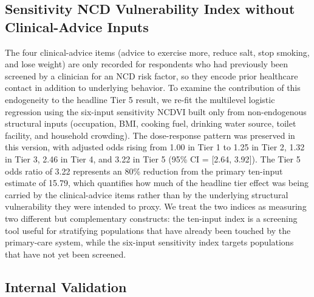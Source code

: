 \documentclass[
  12pt,
  a4paper]{article}
\begin{document}
\subsection{Sensitivity NCD Vulnerability Index without Clinical-Advice Inputs}\label{sensitivity-ncd-vulnerability-index-without-clinical-advice-inputs}

The four clinical-advice items (advice to exercise more, reduce salt, stop smoking, and lose weight) are only recorded for respondents who had previously been screened by a clinician for an NCD risk factor, so they encode prior healthcare contact in addition to underlying behavior. To examine the contribution of this endogeneity to the headline Tier 5 result, we re-fit the multilevel logistic regression using the six-input sensitivity NCDVI built only from non-endogenous structural inputs (occupation, BMI, cooking fuel, drinking water source, toilet facility, and household crowding). The dose-response pattern was preserved in this version, with adjusted odds rising from 1.00 in Tier 1 to 1.25 in Tier 2, 1.32 in Tier 3, 2.46 in Tier 4, and 3.22 in Tier 5 (95\% CI = {[}2.64, 3.92{]}). The Tier 5 odds ratio of 3.22 represents an 80\% reduction from the primary ten-input estimate of 15.79, which quantifies how much of the headline tier effect was being carried by the clinical-advice items rather than by the underlying structural vulnerability they were intended to proxy. We treat the two indices as measuring two different but complementary constructs: the ten-input index is a screening tool useful for stratifying populations that have already been touched by the primary-care system, while the six-input sensitivity index targets populations that have not yet been screened.

\subsection{Internal Validation}\label{internal-validation}
\end{document}

